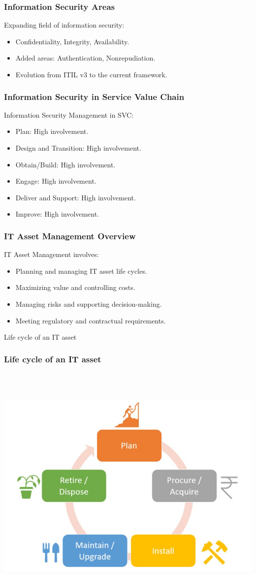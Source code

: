 \documentclass[aspectratio=169, table]{beamer}
\begin{document}
\begin{frame}
\frametitle{Information Security Areas}

Expanding field of information security:
\begin{itemize}
	\item Confidentiality, Integrity, Availability.
	\item Added areas: Authentication, Nonrepudiation.
	\item Evolution from ITIL v3 to the current framework.
\end{itemize}

\end{frame}

\begin{frame}
\frametitle{Information Security in Service Value Chain}

Information Security Management in SVC:
\begin{itemize}
	\item Plan: High involvement.
	\item Design and Transition: High involvement.
	\item Obtain/Build: High involvement.
	\item Engage: High involvement.
	\item Deliver and Support: High involvement.
	\item Improve: High involvement.
\end{itemize}

\end{frame}

\begin{frame}
\frametitle{IT Asset Management Overview}

IT Asset Management involves:
\begin{itemize}
	\item Planning and managing IT asset life cycles.
	\item Maximizing value and controlling costs.
	\item Managing risks and supporting decision-making.
	\item Meeting regulatory and contractual requirements.
\end{itemize}

\end{frame}

\begin{frame}{Life cycle of an IT asset} 	 \frametitle{ Life cycle of an IT asset} \begin{center} 	\includegraphics[width=0.5\linewidth]{images/image-02.png} \end{center} \end{frame}
\end{document}

